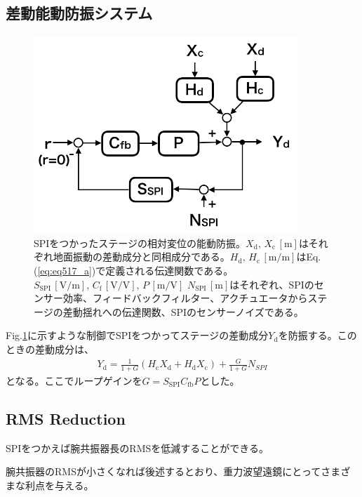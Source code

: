 \subsection{差動能動防振システム}
\begin{figure}[h]
  \begin{center}   
    \includegraphics[width=10cm]{./img_chap5/img511.png}
    \caption{SPIをつかったステージの相対変位の能動防振。$X_{\mathrm{d}},\,X_{\mathrm{c}}\,[\mathrm{m}]$はそれぞれ地面振動の差動成分と同相成分である。$H_{\mathrm{d}},\,H_{\mathrm{c}}\,[\mathrm{m/m}]$はEq.(\ref{eq:eq517_a})で定義される伝達関数である。$S_{\mathrm{SPI}}\,[\mathrm{V/m}],\,C_{\mathrm{f}}\,[\mathrm{V/V}],\,P\,[\mathrm{m/V}]\,\,N_{\mathrm{SPI}}\,[\mathrm{m}]$はそれぞれ、SPIのセンサー効率、フィードバックフィルター、アクチュエータからステージの差動揺れへの伝達関数、SPIのセンサーノイズである。} \label{img:img511}
  \end{center}
\end{figure}
Fig.\ref{img:img511}に示すような制御でSPIをつかってステージの差動成分$Y_{\mathrm{d}}$を防振する。このときの差動成分は、
\begin{eqnarray}
  Y_{\mathrm{d}}=\frac{1}{1+G} \left( H_{\mathrm{c}} X_{\mathrm{d}} + H_{\mathrm{d}}X_{\mathrm{c}} \right) + \frac{G}{1+G} N_{SPI}
\end{eqnarray}
となる。ここでループゲインを$G=S_{\mathrm{SPI}}C_{\mathrm{fb}}P$とした。

\subsection{RMS Reduction}
SPIをつかえば腕共振器長のRMSを低減することができる。

腕共振器のRMSが小さくなれば後述するとおり、重力波望遠鏡にとってさまざまな利点を与える。

